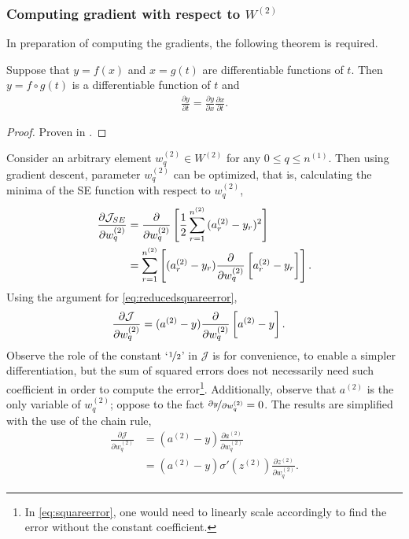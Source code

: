 \subsubsection{Computing gradient with respect to \texorpdfstring{$W^{(2)}$}{W⁽²⁾}}
In preparation of computing the gradients, the following theorem is required.
\begin{thm}
Suppose that $y=f(x)$ and $x=g(t)$ are differentiable functions of $t$. Then $y=f\circ g (t)$ is a differentiable function of $t$ and
\begin{align*}
    \frac{\partial y}{\partial t} = 
    \frac{\partial y}{\partial x}
    \frac{\partial x}{\partial t}.
\end{align*}
\end{thm}
\begin{proof}
Proven in \textcite{Herman2021Chain}.
\end{proof}
Consider an arbitrary element $w^{(2)}_{q} \in W^{(2)}$ for any $0\leq q\leq n^{(1)}$. Then using gradient descent, parameter $w^{(2)}_{q}$ can be optimized, that is, calculating the minima of the SE function with respect to $w^{(2)}_{q}$,
\begin{align*}
    \frac{\partial \mathcal{J}_{SE}}{\partial w^{(2)}_{q}} 
    &= \frac{\partial}{\partial w^{(2)}_{q}} \sbr[4]{\frac{1}{2}\sum_{r=1}^{n^{(2)}} {(a^{(2)}_r-y_r)^2}}\\
     &=\sum_{r=1}^{n^{(2)}}  \left[{(a^{(2)}_r-y_r)} \frac{\partial}{\partial w^{(2)}_{q}} \sbr[3]{a_r^{(2)}-y_r}\right].
\end{align*}
Using the argument for \autoref{eq:reducedsquareerror},
\begin{align}
    \frac{\partial \mathcal{J}}{\partial w^{(2)}_{q}} 
    &=(a^{(2)}-y) \frac{\partial}{\partial w^{(2)}_{q}} \sbr[3]{a^{(2)}-y}.
    \label{eq:costdiff}
\end{align}
Observe the role of the constant `$\nicefrac{1}{2} $' in $\mathcal{J}$ is for convenience, to enable a simpler differentiation, but the sum of squared errors does not necessarily need such coefficient in order to compute the error\footnote{In \autoref{eq:squareerror}, one would need to linearly scale accordingly to find the error without the constant coefficient.}. Additionally, observe that $a^{(2)}$ is the only variable of $w^{(2)}_{q}$; oppose to the fact $\nicefrac{\partial y}{\partial w^{(2)}_{q}} = 0$. The results are simplified with the use of the chain rule,
\begin{align}
    \frac{\partial \mathcal{J}}{\partial w^{(2)}_q} 
    &=(a^{(2)}-y) \frac{\partial a^{(2)}}{\partial w^{(2)}_{q}} \nonumber \\
    &= (a^{(2)}-y) \sigma'(z^{(2)}) \frac{\partial z^{(2)}}{\partial w^{(2)}_q} .\label{eq:costdiff2}
\end{align}
